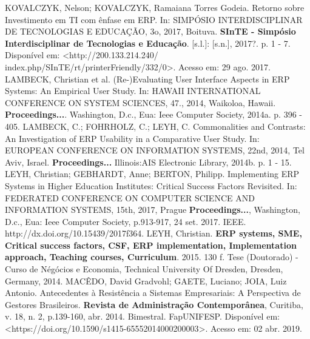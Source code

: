 \newline
\noindent
KOVALCZYK, Nelson; KOVALCZYK, Ramaiana Torres Godeia. Retorno sobre Investimento em TI com ênfase em ERP. In: SIMPÓSIO INTERDISCIPLINAR DE TECNOLOGIAS E EDUCAÇÃO, 3o, 2017, Boituva. \textbf{SInTE - Simpósio Interdisciplinar de Tecnologias e Educação}. [s.l.]: [s.n.], 2017?. p. 1 - 7. Disponível em: <http://200.133.214.240/
index.php/SInTE/rt/printerFriendly/332/0>. Acesso em: 29 ago. 2017.
\newline
\newline
\noindent
LAMBECK, Christian et al. (Re-)Evaluating User Interface Aspects in ERP Systems: An Empirical User Study. In: HAWAII INTERNATIONAL CONFERENCE ON SYSTEM SCIENCES, 47., 2014, Waikoloa, Hawaii. \textbf{Proceedings...}. Washington, D.c., Eua: Ieee Computer Society, 2014a. p. 396 - 405.
\newline
\newline
\noindent
LAMBECK, C.; FOHRHOLZ, C.; LEYH, C. Commonalities and Contrasts: An Investigation of ERP Usability in a Comparative User Study. In:  EUROPEAN CONFERENCE ON INFORMATION SYSTEMS, 22nd, 2014, Tel Aviv, Israel. \textbf{Proceedings...} Illinois:AIS Electronic Library, 2014b. p. 1 - 15. 
\newline
\newline
\noindent 
LEYH, Christian; GEBHARDT, Anne; BERTON, Philipp. Implementing ERP Systems in Higher Education Institutes: Critical Success Factors Revisited. In: FEDERATED CONFERENCE ON COMPUTER SCIENCE AND INFORMATION SYSTEMS, 15th, 2017, Prague \textbf{Proceedings...}, Washington, D.c., Eua: Ieee Computer Society, p.913-917, 24 set. 2017. IEEE. http://dx.doi.org/10.15439/2017f364.
\newline
\newline
\noindent
LEYH, Christian. \textbf{ERP systems, SME, Critical success factors, CSF, ERP implementation, Implementation approach, Teaching courses, Curriculum}. 2015. 130 f. Tese (Doutorado) - Curso de Négócios e Economia, Technical University Of Dresden, Dresden, Germany, 2014.
\newline
\newline
\noindent
MACÊDO, David Gradvohl; GAETE, Luciano; JOIA, Luiz Antonio. Antecedentes à Resistência a Sistemas Empresariais: A Perspectiva de Gestores Brasileiros. \textbf{Revista de Administração Contemporânea}, Curitiba, v. 18, n. 2, p.139-160, abr. 2014. Bimestral. FapUNIFESP. Disponível em: <https://doi.org/10.1590/s1415-65552014000200003>. Acesso em: 02 abr. 2019.
\newline
